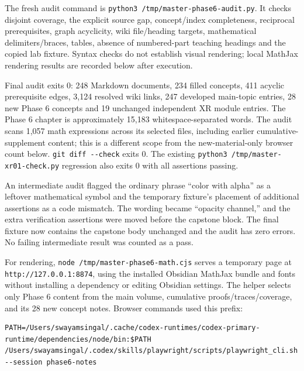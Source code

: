\hypertarget{appendix-a103e7846d21-structural-and-rendering-checks}{}

The fresh audit command is \texttt{python3\ /tmp/master-phase6-audit.py}. It checks disjoint coverage, the explicit source gap, concept/index completeness, reciprocal prerequisites, graph acyclicity, wiki file/heading targets, mathematical delimiters/braces, tables, absence of numbered-part teaching headings and the copied lab fixture. Syntax checks do not establish visual rendering; local MathJax rendering results are recorded below after execution.

Final audit exits 0: 248 Markdown documents, 234 filled concepts, 411 acyclic prerequisite edges, 3,124 resolved wiki links, 247 developed main-topic entries, 28 new Phase 6 concepts and 19 unchanged independent XR module entries. The Phase 6 chapter is approximately 15,183 whitespace-separated words. The audit scans 1,057 math expressions across its selected files, including earlier cumulative-supplement content; this is a different scope from the new-material-only browser count below. \texttt{git\ diff\ -\/-check} exits 0. The existing \texttt{python3\ /tmp/master-xr01-check.py} regression also exits 0 with all assertions passing.

An intermediate audit flagged the ordinary phrase ``color with alpha'' as a leftover mathematical symbol and the temporary fixture's placement of additional assertions as a code mismatch. The wording became ``opacity channel,'' and the extra verification assertions were moved before the capstone block. The final fixture now contains the capstone body unchanged and the audit has zero errors. No failing intermediate result was counted as a pass.

For rendering, \texttt{node\ /tmp/master-phase6-math.cjs} serves a temporary page at \texttt{http://127.0.0.1:8874}, using the installed Obsidian MathJax bundle and fonts without installing a dependency or editing Obsidian settings. The helper selects only Phase 6 content from the main volume, cumulative proofs/traces/coverage, and its 28 new concept notes. Browser commands used this prefix:

\begin{verbatim}
PATH=/Users/swayamsingal/.cache/codex-runtimes/codex-primary-runtime/dependencies/node/bin:$PATH /Users/swayamsingal/.codex/skills/playwright/scripts/playwright_cli.sh --session phase6-notes
\end{verbatim}

